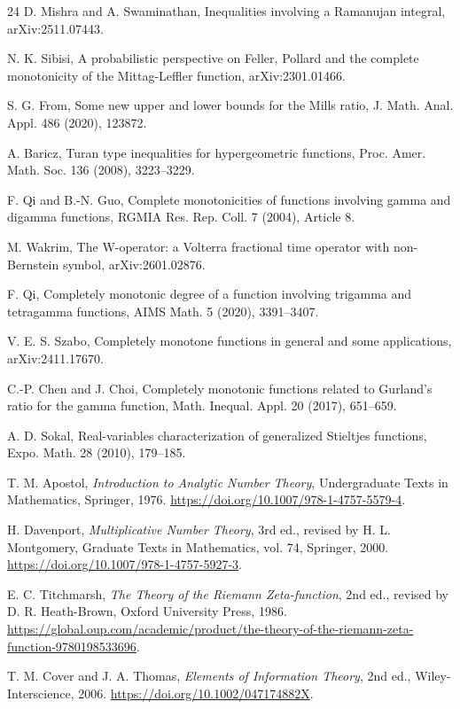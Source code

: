 \documentclass[11pt]{article}
\numberwithin{equation}{section}
\theoremstyle{definition}
\theoremstyle{remark}
\newcommand{\1}{\mathbf 1}
\begin{document}
\begin{thebibliography}{24}
D. Mishra and A. Swaminathan,
\newblock Inequalities involving a Ramanujan integral,
\newblock arXiv:2511.07443.

N. K. Sibisi,
\newblock A probabilistic perspective on Feller, Pollard and the complete
  monotonicity of the Mittag-Leffler function,
\newblock arXiv:2301.01466.

S. G. From,
\newblock Some new upper and lower bounds for the Mills ratio,
\newblock J. Math. Anal. Appl. 486 (2020), 123872.

A. Baricz,
\newblock Turan type inequalities for hypergeometric functions,
\newblock Proc. Amer. Math. Soc. 136 (2008), 3223--3229.

F. Qi and B.-N. Guo,
\newblock Complete monotonicities of functions involving gamma and digamma
  functions,
\newblock RGMIA Res. Rep. Coll. 7 (2004), Article 8.

M. Wakrim,
\newblock The W-operator: a Volterra fractional time operator with
  non-Bernstein symbol,
\newblock arXiv:2601.02876.

F. Qi,
\newblock Completely monotonic degree of a function involving trigamma and
  tetragamma functions,
\newblock AIMS Math. 5 (2020), 3391--3407.

V. E. S. Szabo,
\newblock Completely monotone functions in general and some applications,
\newblock arXiv:2411.17670.

C.-P. Chen and J. Choi,
\newblock Completely monotonic functions related to Gurland's ratio for the
  gamma function,
\newblock Math. Inequal. Appl. 20 (2017), 651--659.

A. D. Sokal,
\newblock Real-variables characterization of generalized Stieltjes functions,
\newblock Expo. Math. 28 (2010), 179--185.

T. M. Apostol,
\emph{Introduction to Analytic Number Theory},
Undergraduate Texts in Mathematics, Springer, 1976.
\url{https://doi.org/10.1007/978-1-4757-5579-4}.

H. Davenport,
\emph{Multiplicative Number Theory},
3rd ed., revised by H. L. Montgomery, Graduate Texts in Mathematics, vol. 74, Springer, 2000.
\url{https://doi.org/10.1007/978-1-4757-5927-3}.

E. C. Titchmarsh,
\emph{The Theory of the Riemann Zeta-function},
2nd ed., revised by D. R. Heath-Brown, Oxford University Press, 1986.
\url{https://global.oup.com/academic/product/the-theory-of-the-riemann-zeta-function-9780198533696}.

T. M. Cover and J. A. Thomas,
\emph{Elements of Information Theory},
2nd ed., Wiley-Interscience, 2006.
\url{https://doi.org/10.1002/047174882X}.

\end{thebibliography}
\end{document}
